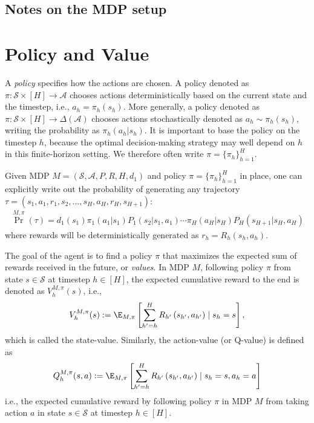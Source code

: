 \subsection{Notes on the MDP setup}

\section{Policy and Value}
A {\em policy} specifies how the actions are chosen.
A policy denoted as $\pi:\mathcal{S}\times[H]\to\mathcal{A}$ chooses actions deterministically based on the current state and the timestep, i.e., $a_h=\pi_h(s_h)$.
More generally, a policy denoted as $\pi:\mathcal{S}\times[H]\to\Delta(\mathcal{A})$ chooses actions stochastically denoted as $a_h\sim\pi_h(s_h)$, writing the probability as $\pi_h(a_h|s_h)$.
It is important to base the policy on the timestep $h$, because the optimal decision-making strategy may well depend on $h$ in this finite-horizon setting.
We therefore often write $\pi=\{\pi_h\}_{h=1}^H$.

Given MDP $M=(\mathcal{S},\mathcal{A}, P, R, H, d_1)$ and policy $\pi=\{\pi_h\}_{h=1}^H$ in place, one can explicitly write out the probability of generating any trajectory $\tau=\left(s_1, a_1, r_1, s_2, \ldots, s_H, a_H, r_H, s_{H+1}\right)$:
\begin{align*}
    \textstyle\Pr^{M,\pi}(\tau) = d_1(s_1)\pi_1(a_1|s_1)P_1(s_2|s_1,a_1)\cdots\pi_H(a_H|s_H)P_H(s_{H+1}|s_H,a_H)
\end{align*}
where rewards will be deterministically generated as $r_h=R_h(s_h,a_h)$.

The goal of the agent is to find a policy $\pi$ that maximizes the expected sum of rewards received in the future, or {\em values}.
In MDP $M$, following policy $\pi$ from state $s\in\mathcal{S}$ at timestep $h\in[H]$, the expected cumulative reward to the end is denoted as $V^{M,\pi}_h(s)$, i.e.,
\begin{align*}  V^{M,\pi}_h(s):=\E_{M,\pi}\left[\sum_{h^{\prime}=h}^H R_{h^{\prime}}\left(s_{h^{\prime}}, a_{h^{\prime}}\right) \mid s_h=s\right]
,
\end{align*}
which is called the state-value.
Similarly, the action-value (or Q-value) is defined as 
\begin{align*}
    Q^{M,\pi}_h(s, a):=\E_{M,\pi}\left[\sum_{h^{\prime}=h}^H R_{h^{\prime}}\left(s_{h^{\prime}}, a_{h^{\prime}}\right) \mid s_h=s, a_h=a\right]
\end{align*}
i.e., the expected cumulative reward by following policy $\pi$ in MDP $M$ from taking action $a$ in state $s\in\mathcal{S}$ at timestep $h\in[H]$.

